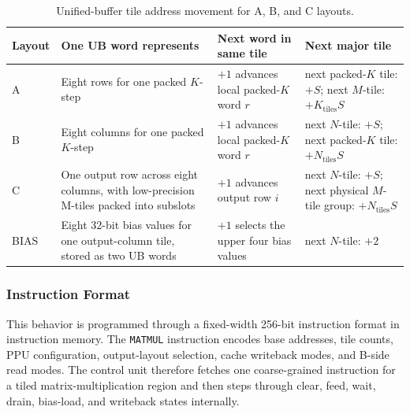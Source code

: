 \documentclass[a4paper, 12pt, titlepage]{article}
\begin{document}
\begin{table}[H]
    \centering
    \small
    \caption{Unified-buffer tile address movement for A, B, and C layouts.}
    \label{tab:matrix-layout-addressing}
    \begin{tabularx}{\textwidth}{|l|Y|Y|Y|}
        \hline
        \textbf{Layout} & \textbf{One UB word represents} & \textbf{Next word in same tile} & \textbf{Next major tile} \\
        \hline
        A & Eight rows for one packed \(K\)-step & \(+1\) advances local packed-\(K\) word \(r\) & next packed-\(K\) tile: \(+S\); next \(M\)-tile: \(+K_{\mathrm{tiles}}S\) \\
        \hline
        B & Eight columns for one packed \(K\)-step & \(+1\) advances local packed-\(K\) word \(r\) & next \(N\)-tile: \(+S\); next packed-\(K\) tile: \(+N_{\mathrm{tiles}}S\) \\
        \hline
        C & One output row across eight columns, with low-precision M-tiles packed into subslots & \(+1\) advances output row \(i\) & next \(N\)-tile: \(+S\); next physical \(M\)-tile group: \(+N_{\mathrm{tiles}}S\) \\
        \hline
        BIAS & Eight 32-bit bias values for one output-column tile, stored as two UB words & \(+1\) selects the upper four bias values & next \(N\)-tile: \(+2\) \\
        \hline
    \end{tabularx}
\end{table}

\subsubsection{Instruction Format}
This behavior is programmed through a fixed-width 256-bit instruction format in instruction memory. The \texttt{MATMUL} instruction encodes base addresses, tile counts, PPU configuration, output-layout selection, cache writeback modes, and B-side read modes. The control unit therefore fetches one coarse-grained instruction for a tiled matrix-multiplication region and then steps through clear, feed, wait, drain, bias-load, and writeback states internally.
\end{document}
